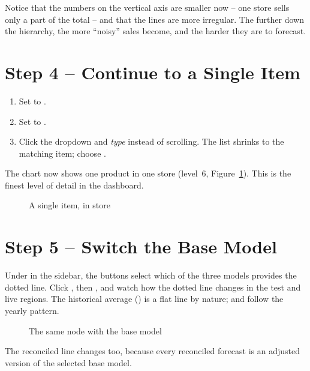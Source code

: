 Notice that the numbers on the vertical axis are smaller now -- one store sells only a part of the total -- and that the lines are more irregular. The further down the hierarchy, the more ``noisy'' sales become, and the harder they are to forecast.

\section{Step 4 -- Continue to a Single Item}
\label{sec:fsItem}

\begin{enumerate}
  \item Set  to .
  \item Set  to .
  \item Click the  dropdown and \emph{type}  instead of scrolling. The list shrinks to the matching item; choose .
\end{enumerate}

The chart now shows one product in one store (level~6, Figure~\ref{fig:fsItem}). This is the finest level of detail in the dashboard.

\begin{figure}[H]
  \centering
  \caption{A single item,  in store }
  \label{fig:fsItem}
\end{figure}

\section{Step 5 -- Switch the Base Model}
\label{sec:fsModel}

Under  in the sidebar, the  buttons select which of the three models provides the dotted line. Click , then , and watch how the dotted line changes in the test and live regions. The historical average () is a flat line by nature;  and  follow the yearly pattern.

\begin{figure}[H]
  \centering
  \caption{The same node with the base model }
  \label{fig:fsModel}
\end{figure}

\begin{NoteBox}
The reconciled line changes too, because every reconciled forecast is an adjusted version of the selected base model.
\end{NoteBox}

